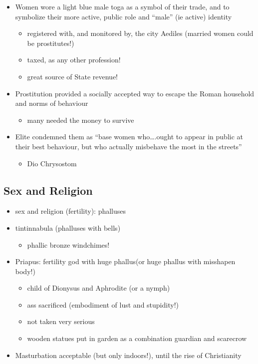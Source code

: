 \documentclass[12pt, twoside]{article}
\begin{document}
\begin{itemize}
\item Women wore a light blue male toga as a symbol of their trade, and to symbolize their more active, public role and “male” (ie active) identity
	\begin{itemize}
	\item registered with, and monitored by, the city Aediles (married women could be prostitutes!)
	\item taxed, as any other profession!
	\item great source of State revenue!
	\end{itemize}
\item Prostitution provided a socially accepted way to escape the Roman household and norms of behaviour
	\begin{itemize}
	\item many needed the money to survive
	\end{itemize}
\item Elite condemned them as “base women who….ought to appear in public at their best behaviour, but who actually misbehave the most in the streets” 
	\begin{itemize}
	\item Dio Chrysostom
	\end{itemize}
\end{itemize}

\subsection{Sex and Religion}
\begin{itemize}
\item sex and religion (fertility): phalluses
\item tintinnabula (phalluses with bells)
	\begin{itemize}
	\item phallic bronze windchimes!
	\end{itemize}
\item Priapus: fertility god with huge phallus(or huge phallus with misshapen body!)
	\begin{itemize}
	\item child of Dionysus and Aphrodite (or a nymph)
	\item ass sacrificed (embodiment of lust and stupidity!)
	\item not taken very serious
	\item wooden statues put in garden as a combination guardian and scarecrow
	\end{itemize}
\item Masturbation acceptable (but only indoors!), until the rise of Christianity
\end{itemize}
\end{document}

